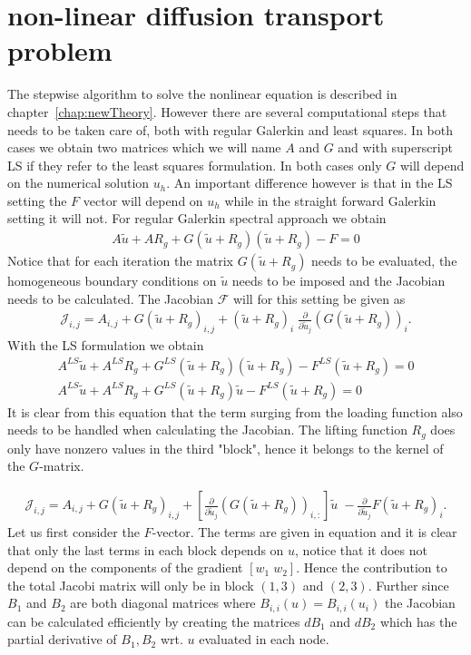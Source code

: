 \section{non-linear diffusion transport problem}
The stepwise algorithm to solve the nonlinear equation is described in chapter~\ref{chap:newTheory}. However there are several computational steps that needs to be taken care of, both with regular Galerkin and least squares. In both cases we obtain two matrices which we will name $A$ and $G$ and with superscript LS if they refer to the least squares formulation. In both cases only $G$ will depend on the numerical solution $u_h$. An important difference however is that in the LS setting the $F$ vector will depend on $u_h$ while in the straight forward Galerkin setting it will not. For regular Galerkin spectral approach we obtain
%
\begin{align}
	A \tilde{u} + AR_g  + G(\tilde{u}+R_g)(\tilde{u}+R_g) -F = 0
\end{align}
Notice that for each iteration the matrix $G(\tilde{u}+R_g)$ needs to be evaluated, the homogeneous boundary conditions on $\tilde{u}$ needs to be imposed and the Jacobian needs to be calculated. The Jacobian $\mathcal{F}$ will for this setting be given as
%
\begin{align}
	\mathcal{J}_{i,j} = A_{i,j} + G(\tilde{u}+R_g)_{i,j} +  (\tilde{u}+R_g)_i \; \frac{\partial}{\partial \tilde{u}_j} (G(\tilde{u}+R_g))_i.
\end{align}
%
With the LS formulation we obtain
\begin{align}
A^{LS}\tilde{u} + A^{LS}R_g  + G^{LS}(\tilde{u}+R_g)(\tilde{u}+R_g) -F^{LS}(\tilde{u}+R_g) = 0\\
A^{LS}\tilde{u} + A^{LS}R_g  + G^{LS}(\tilde{u}+R_g)\tilde{u} -F^{LS}(\tilde{u}+R_g) = 0
\end{align}
It is clear from this equation that the term surging from the loading function also needs to be handled when calculating the Jacobian. The lifting function $R_g$ does only have nonzero values in the third "block", hence it belongs to the kernel of the $G$-matrix.

\begin{align}
	\mathcal{J}_{i,j} = A_{i,j} + G(\tilde{u}+R_g)_{i,j} +  [\frac{\partial}{\partial \tilde{u}_j} (G(\tilde{u}+R_g))_{i,:}] \tilde{u} \; - \frac{\partial}{\partial \tilde{u}_j}F(\tilde{u}+R_g)_i.
\end{align}
%
Let us first consider the $F$-vector. The terms are given in equation and it is clear that only the last terms in each block depends on $u$, notice that it does not depend on the components of the gradient $[ w_1 \; w_2]$. Hence the contribution to the total Jacobi matrix will only be in block $(1,3)$ and $(2,3)$. Further since $B_1$ and $B_2$ are both diagonal matrices where $B_{i,i}(u) = B_{i,i}(u_i)$ the Jacobian can be calculated efficiently by creating the matrices $dB_1$ and $dB_2$ which has the partial derivative of $B_1,B_2$ wrt. $u$ evaluated in each node.   



